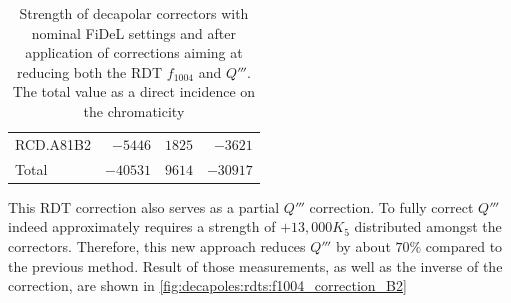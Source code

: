 \begin{table}[!htb]
\begin{tabular}{lrrr}
    \hspace{2mm}RCD.A81B2 &$-5446$ & $1825 $ &  $-3621 $\\
    \hspace{2mm}Total     &$-40531$& $9614 $ &  $-30917$      \\
    \bottomrule
    \end{tabular}
    \caption{Strength of decapolar correctors with nominal FiDeL settings and after application of
    corrections aiming at reducing both the RDT $f_{1004}$ and $Q'''$. The total value as a direct
    incidence on the chromaticity}
    \label{tab:decapoles:rdts:correction_f1004_k5}
\end{table}

This RDT correction also serves as a partial $Q'''$ correction. To fully correct $Q'''$ indeed
approximately requires a strength of $+13,000 K_5$ distributed amongst the correctors.  Therefore,
this new approach reduces $Q'''$ by about $70\%$ compared to the previous method. Result of those
measurements, as well as the inverse of the correction, are shown in 
\cref{fig:decapoles:rdts:f1004_correction_B2}

